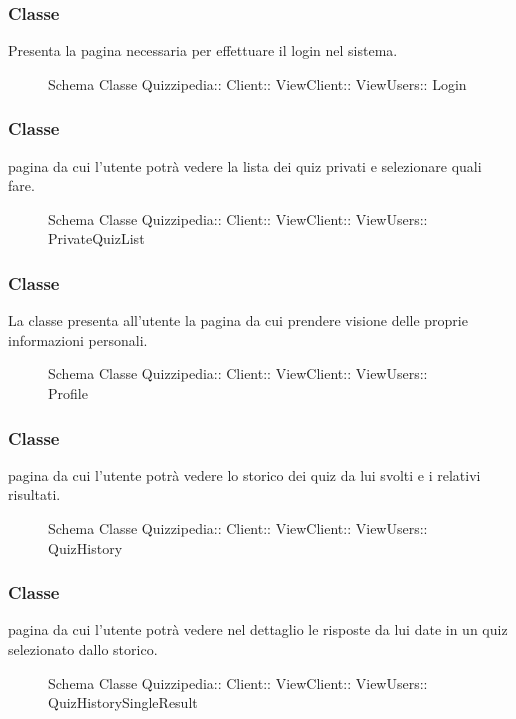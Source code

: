 \subsubsection{Classe }
Presenta la pagina necessaria per effettuare il login nel sistema.
\begin{figure}[H]
\centering
\noindent{}
\caption[Schema Classe Login]{Schema Classe Quizzipedia:: Client:: ViewClient:: ViewUsers:: Login}
\end{figure}
\subsubsection{Classe }
pagina da cui l'utente potrà vedere la lista dei quiz privati e selezionare quali fare.
\begin{figure}[H]
\centering
\noindent{}
\caption[Schema Classe PrivateQuizList]{Schema Classe Quizzipedia:: Client:: ViewClient:: ViewUsers:: PrivateQuizList}
\end{figure}
\subsubsection{Classe }
La classe presenta all'utente la pagina da cui prendere visione delle proprie informazioni personali.
\begin{figure}[H]
\centering
\noindent{}
\caption[Schema Classe Profile]{Schema Classe Quizzipedia:: Client:: ViewClient:: ViewUsers:: Profile}
\end{figure}
\subsubsection{Classe }
pagina da cui l'utente potrà vedere lo storico dei quiz da lui svolti e i relativi risultati.
\begin{figure}[H]
\centering
\noindent{}
\caption[Schema Classe QuizHistory]{Schema Classe Quizzipedia:: Client:: ViewClient:: ViewUsers:: QuizHistory}
\end{figure}
\subsubsection{Classe }
pagina da cui l'utente potrà vedere nel dettaglio le risposte da lui date in un quiz selezionato dallo storico.
\begin{figure}[H]
\centering
\noindent{}
\caption[Schema Classe QuizHistorySingleResult]{Schema Classe Quizzipedia:: Client:: ViewClient:: ViewUsers:: QuizHistorySingleResult}
\end{figure}
